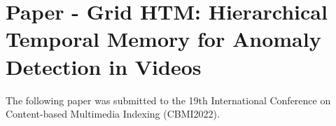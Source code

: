 \documentclass[USenglish]{ifimaster}  %
\begin{document}
\appendix
\chapter{Paper - Grid HTM: Hierarchical Temporal Memory for Anomaly Detection in Videos}
\label{appendix:paper}
The following paper was submitted to the 19th International Conference on Content-based Multimedia Indexing (CBMI2022).

\end{document}

